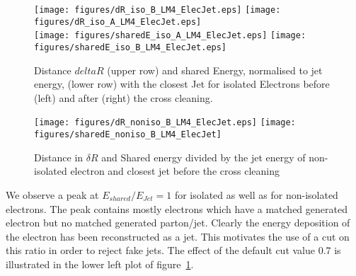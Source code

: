 \documentclass{cmspaper}
\begin{document}
\begin{figure}[hb]
\begin{center}
    \texttt{[image: figures/dR\_iso\_B\_LM4\_ElecJet.eps]}
    \texttt{[image: figures/dR\_iso\_A\_LM4\_ElecJet.eps]}\\
    \texttt{[image: figures/sharedE\_iso\_A\_LM4\_ElecJet.eps]}
    \texttt{[image: figures/sharedE\_iso\_B\_LM4\_ElecJet.eps]}
    \caption{Distance \(delta R\) (upper row) and shared Energy, normalised to jet energy, (lower row) with the closest Jet for isolated Electrons before (left) and after (right) the cross cleaning.}
\label{fig:dR_sE_ElecJet_iso}
\end{center}
\end{figure}


\begin{figure}[hb]
\begin{center}
    \texttt{[image: figures/dR\_noniso\_B\_LM4\_ElecJet.eps]}
    \texttt{[image: figures/sharedE\_noniso\_B\_LM4\_ElecJet]}
    \caption{Distance in $\delta R$ and Shared energy divided by the jet energy of non-isolated electron and closest jet
before the cross cleaning}
\label{fig:dR_sE_ElecJet_noniso}
\end{center}
\end{figure}

We observe a peak at $E_{shared}/E_{Jet}=1$ for isolated as well as for
non-isolated electrons. The peak contains mostly electrons which have a matched
generated electron but no matched generated parton/jet. Clearly the energy
deposition of the electron has been reconstructed as a jet. This motivates the
use of a cut on this ratio in order to reject fake jets. The effect of the
default cut value 0.7 is illustrated in the lower left plot of
figure~\ref{fig:dR_sE_ElecJet_iso}.\\
\end{document}
